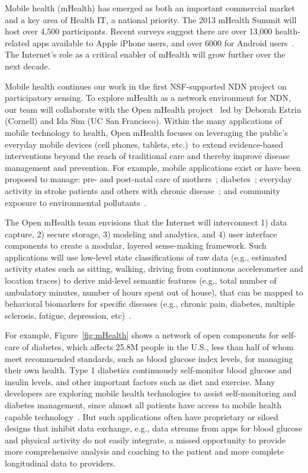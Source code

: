Mobile health (mHealth) has emerged as both an important commercial
market and a key area of Health IT, a national priority. The 2013 mHealth
Summit
will host over 4,500 participants.  Recent surveys suggest there are
over 13,000 health-related apps available to Apple iPhone
users, and over 6000 for Android users~\cite{Eng_Lee13}.  The 
Internet's role as a critical enabler of mHealth will grow further over
the next decade.

Mobile health continues our work in the first NSF-supported NDN project
on participatory sensing. 
To explore mHealth as a network environment for NDN, our team will
collaborate with the Open mHealth project~\cite{chen2012making}  led by
Deborah Estrin (Cornell) and Ida Sim (UC San Francisco). Within the many
applications of mobile technology to health, Open mHealth focuses on
leveraging the public's everyday mobile devices (cell phones, tablets,
etc.)~to extend evidence-based interventions beyond the reach of traditional
care and thereby improve disease management and prevention.  For
example, mobile applications exist or have been proposed to manage:
pre- and post-natal care of mothers~\cite{Gurman_etal12}; 
diabetes~\cite{Sieverdes_etal13,Tamrat_Kachnowski12}; 
everyday activity in stroke patients and others with chronic
disease~\cite{Dobkin_Dorsch11}; and community exposure to
environmental pollutants~\cite{Ramanathan20114481}.



The Open mHealth team envisions that the Internet will interconnect 1)
data capture, 2) secure storage, 3) modeling and analytics, and 4) user
interface components to create a modular, layered sense-making framework.  
Such applications will use low-level state
classifications of raw data (e.g., estimated activity states such as
sitting, walking, driving from continuous accelerometer and location
traces) to derive mid-level semantic features (e.g., total number of
ambulatory minutes, number of hours spent out of house), that can 
be mapped to behavioral biomarkers for specific diseases
(e.g., chronic pain, diabetes, multiple sclerosis, fatigue, depression,
etc)~\cite{Estrin_IPSN_2013}.


For example, Figure~\ref{fig:mHealth} shows a network of open components
for self-care of diabetes, which affects 25.8M people in the U.S., 
less than half of whom meet recommended standards, such as blood
glucose index levels, for managing their own health. Type 1 diabetics
continuously self-monitor blood glucose and insulin levels, and
other important factors such as diet and exercise.  Many developers are
exploring mobile health technologies to assist self-monitoring and
diabetes management, since almost all
patients have access to
mobile health capable technology~\cite{Sieverdes_etal13}.   
But such applications often have proprietary or siloed
designs that inhibit data exchange, e.g., data streams from 
apps for blood glucose and physical activity do not easily
integrate,  %
a missed opportunity to
provide more comprehensive analysis and coaching to the patient and more
complete longitudinal data to providers.


